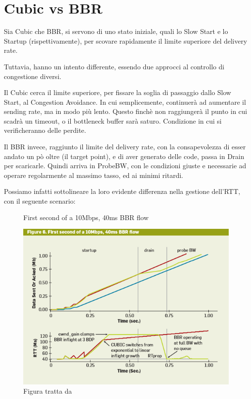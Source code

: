 \section{Cubic vs BBR}

Sia Cubic che BBR, si servono di uno stato iniziale, quali lo Slow Start e lo Startup (rispettivamente), per scovare rapidamente il limite superiore del delivery rate. \bigskip

Tuttavia, hanno un intento differente, essendo due approcci al controllo di congestione diversi. \bigskip

Il Cubic cerca il limite superiore, per fissare la soglia di passaggio dallo Slow Start, al Congestion Avoidance. In cui semplicemente, continuerà ad aumentare il sending rate, ma in modo più lento. Questo finchè non raggiungerà il punto in cui scadrà un timeout, o il bottleneck buffer sarà saturo. Condizione in cui si verificheranno delle perdite. \bigskip

Il BBR invece, raggiunto il limite del delivery rate, con la consapevolezza di esser andato un pò oltre (il target point), e di aver generato delle code, passa in Drain per scaricarle.
Quindi arriva in ProbeBW, con le condizioni giuste e necessarie ad operare regolarmente al massimo tasso, ed ai minimi ritardi. \bigskip

Possiamo infatti sottolineare la loro evidente differenza nella gestione dell'RTT, con il seguente scenario:

\begin{figure}[H]

\center
\caption{First second of a 10Mbps, 40ms BBR flow}
\includegraphics[scale=1.1]{chapters/application/img/start_cubic_bbr}
\caption*{Figura tratta da \cite[p.~63]{Cardwell:2017:BCC:3042068.3009824}}

\end{figure}

